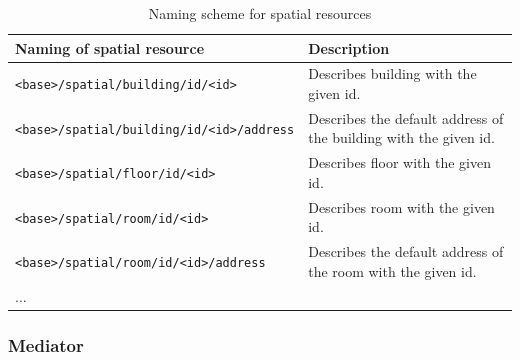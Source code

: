 \documentclass[draft,final]{vutinfth} %
\begin{document}
\begin{table}
  \centering
  \begin{tabular}{p{}p{}}
    \toprule
    Naming of spatial resource & Description \\
    \midrule
    \texttt{<base>/spatial/building/id/<id>} & Describes building with the given id.\\
    \texttt{<base>/spatial/building/id/<id>/address} & Describes the default address of the building with the given id.\\    
    \texttt{<base>/spatial/floor/id/<id>} & Describes floor with the given id.\\
    \texttt{<base>/spatial/room/id/<id>} & Describes room with the given id.\\
        \texttt{<base>/spatial/room/id/<id>/address} & Describes the default address of the room with the given id.\\ 
    ...\\
    \bottomrule
  \end{tabular}
  \caption{Naming scheme for spatial resources}
  \label{tab:architectural-prototype:resource-naming-scheme}
\end{table}

\subsubsection{Mediator}
\end{document}
